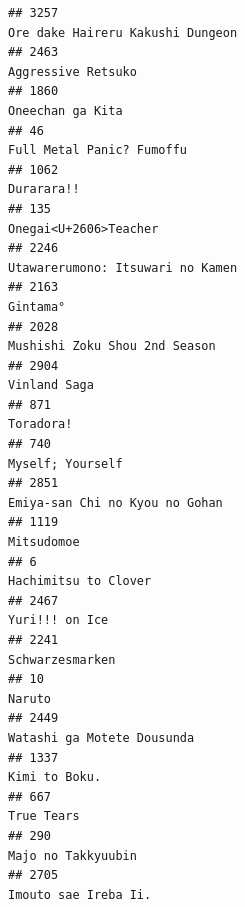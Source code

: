 \documentclass[
]{article}
\begin{document}
\begin{verbatim}
## 3257                                                                          Ore dake Haireru Kakushi Dungeon
## 2463                                                                                        Aggressive Retsuko
## 1860                                                                                          Oneechan ga Kita
## 46                                                                                   Full Metal Panic? Fumoffu
## 1062                                                                                                Durarara!!
## 135                                                                                      Onegai<U+2606>Teacher
## 2246                                                                          Utawarerumono: Itsuwari no Kamen
## 2163                                                                                                  Gintama°
## 2028                                                                             Mushishi Zoku Shou 2nd Season
## 2904                                                                                              Vinland Saga
## 871                                                                                                  Toradora!
## 740                                                                                           Myself; Yourself
## 2851                                                                            Emiya-san Chi no Kyou no Gohan
## 1119                                                                                                Mitsudomoe
## 6                                                                                         Hachimitsu to Clover
## 2467                                                                                            Yuri!!! on Ice
## 2241                                                                                           Schwarzesmarken
## 10                                                                                                      Naruto
## 2449                                                                                Watashi ga Motete Dousunda
## 1337                                                                                             Kimi to Boku.
## 667                                                                                                 True Tears
## 290                                                                                         Majo no Takkyuubin
## 2705                                                                                      Imouto sae Ireba Ii.

\end{verbatim}
\end{document}
